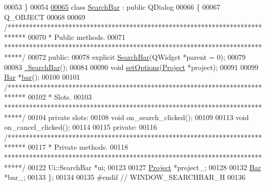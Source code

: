 \begin{DoxyCode}
00053 \}
00054 
\hypertarget{searchbar_8h_source_l00065}{}\hyperlink{class_search_bar}{00065} \textcolor{keyword}{class }\hyperlink{class_search_bar}{SearchBar} : \textcolor{keyword}{public} QDialog
00066 \{
00067   Q\_OBJECT
00068 
00069   \textcolor{comment}{/*****************************************************************************}
00070 \textcolor{comment}{  * Public methods.}
00071 \textcolor{comment}{  *****************************************************************************/}
00072 \textcolor{keyword}{public}:
00078   \textcolor{keyword}{explicit} \hyperlink{group___window_ga75f8caf009094148f56149b00996ac84}{SearchBar}(QWidget *parent = 0);
00079 
00083   \hyperlink{group___window_ga553f2c7b9c15e7ae39cf988a6ef8f786}{~SearchBar}();
00084 
00090   \textcolor{keywordtype}{void} \hyperlink{group___window_ga840eb8fbdea559d31a7c2af6a4cbc480}{setOptions}(\hyperlink{class_project}{Project} *project);
00091 
00099   \hyperlink{class_bar}{Bar} *\hyperlink{group___window_ga25ce5aca2c8db4e81e5357c9a4c01b56}{bar}();
00100 
00101   \textcolor{comment}{/*****************************************************************************}
00102 \textcolor{comment}{  * Slots.}
00103 \textcolor{comment}{  *****************************************************************************/}
00104 \textcolor{keyword}{private} slots:
00108   \textcolor{keywordtype}{void} on\_search\_clicked();
00109 
00113   \textcolor{keywordtype}{void} on\_cancel\_clicked();
00114 
00115 \textcolor{keyword}{private}:
00116   \textcolor{comment}{/*****************************************************************************}
00117 \textcolor{comment}{  * Private methods.}
00118 \textcolor{comment}{  *****************************************************************************/}
00122   Ui::SearchBar *ui;
00123 
00127   \hyperlink{class_project}{Project} *project\_;
00128 
00132   \hyperlink{class_bar}{Bar} *bar\_;
00133 \};
00134 
00135 \textcolor{preprocessor}{#endif  // WINDOW\_SEARCHBAR\_H}
00136 
\end{DoxyCode}

